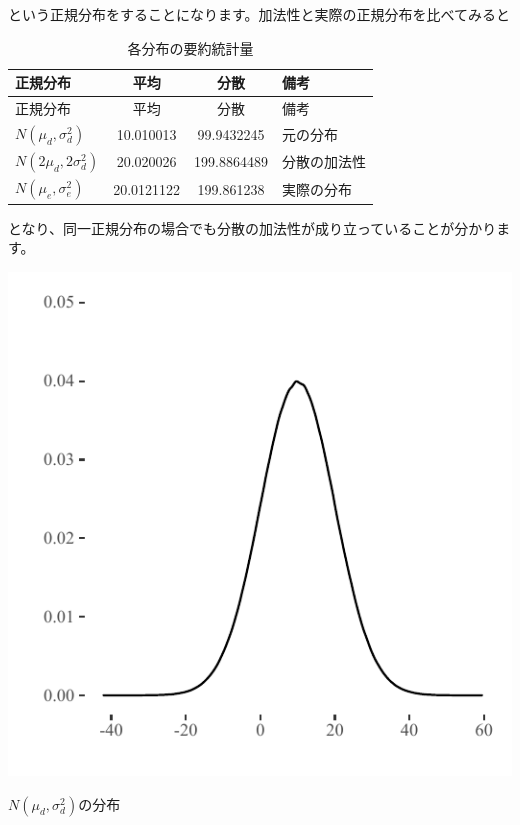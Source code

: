\documentclass[]{tufte-handout}
\begin{document}
という正規分布をすることになります。加法性と実際の正規分布を比べてみると

\begin{longtable}[]{@{}lccl@{}}
\caption{各分布の要約統計量}\tabularnewline
\toprule
正規分布 & 平均 & 分散 & 備考 \\
\midrule
\endfirsthead
\toprule
正規分布 & 平均 & 分散 & 備考 \\
\midrule
\endhead
\(N(\mu_d, \sigma^2_d)\) & 10.010013 & 99.9432245 & 元の分布 \\
\(N(2\mu_d, 2\sigma^2_d)\) & 20.020026 & 199.8864489 & 分散の加法性 \\
\(N(\mu_e, \sigma^2_e)\) & 20.0121122 & 199.861238 & 実際の分布 \\
\bottomrule
\end{longtable}

となり、同一正規分布の場合でも分散の加法性が成り立っていることが分かります。

\begin{marginfigure}

{\centering \includegraphics{AdditivityOfVariance_files/figure-latex/unnamed-chunk-8-1} 

}

\caption[$N(\mu_d, \sigma^2_d)$の分布]{$N(\mu_d, \sigma^2_d)$の分布}\label{fig:unnamed-chunk-8}
\end{marginfigure}
\end{document}
